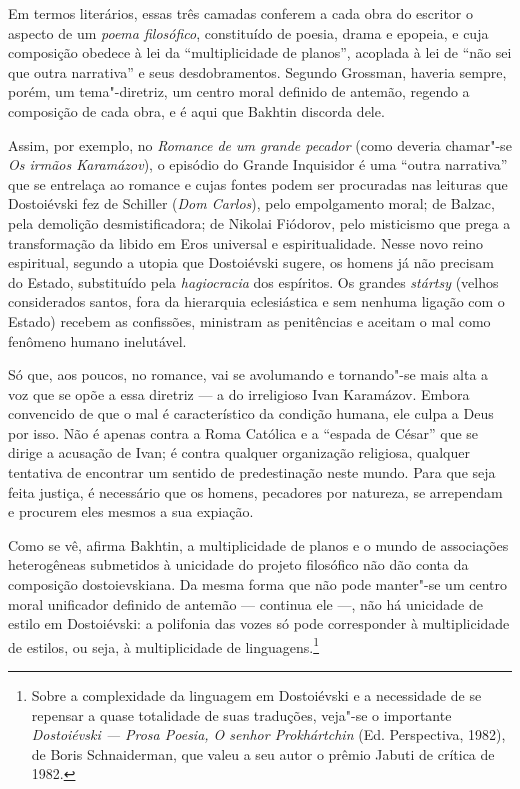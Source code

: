 {{Em termos literários, essas três camadas confe­rem a cada obra do
escritor o aspecto de um \emph{poema filosófico}, constituído de poesia,
drama e epopeia, e cuja composição obedece à lei da ``multiplicidade de
planos'', acoplada à lei de ``não sei que outra narrativa'' e seus
desdobramentos. Segundo Grossman, haveria sempre, porém, um
tema"-diretriz, um centro moral definido de antemão, regendo a composição
de cada obra, e é aqui que Bakhtin discorda dele.

Assim, por exemplo, no \emph{Romance de um grande pecador} (como deveria
chamar"-se \emph{Os irmãos Karamázov}), o episódio do Grande
Inquisidor é uma ``outra narrativa'' que se entrelaça ao romance e cujas
fontes podem ser procuradas nas leituras que Dostoiévski fez de Schiller
(\emph{Dom Carlos}), pelo empolgamento moral; de Balzac, pela
demolição desmistificadora; de Nikolai Fiódorov, pelo misticismo que
prega a transformação da libido em Eros universal e espiritualidade.
Nesse novo reino espiritual, segundo a utopia que Dostoiévski sugere, os
homens já não precisam do Estado, substituído pela \emph{hagiocracia}
dos espíritos. Os grandes \emph{stártsy} (velhos considerados santos,
fora da hierarquia eclesiástica e sem nenhuma ligação com o Estado)
recebem as confissões, ministram as penitências e aceitam o mal como
fenômeno humano inelutável.

Só que, aos poucos, no romance, vai se avolu­mando e tornando"-se mais
alta a voz que se opõe a essa diretriz --- a do irreligioso Ivan
Karamázov. Embora convencido de que o mal é característico da condição
humana, ele culpa a Deus por isso. Não é apenas contra a Roma Católica e
a ``espada de César'' que se dirige a acusação de Ivan; é contra
qualquer organização religiosa, qualquer tentativa de encontrar um
sentido de predestinação neste mundo. Para que seja feita justiça, é
necessário que os homens, pecadores por natureza, se arrependam e
procu­rem eles mesmos a sua expiação.

Como se vê, afirma Bakhtin, a multiplicidade de planos e o mundo de
associações heterogêneas submetidos à unicidade do projeto filosófico
não dão conta da composição dostoievskiana. Da mesma forma que não pode
manter"-se um centro moral unificador definido de antemão --- continua ele
---, não há unicidade de estilo em Dostoiévski: a polifonia das vozes só
pode corresponder à multiplicidade de estilos, ou seja, à multiplicidade
de linguagens.\footnote{Sobre a complexidade da linguagem em Dostoiévski
  e a necessidade de se repensar a quase totalidade de suas traduções,
  veja"-se o importante \emph{Dostoiévski --- Prosa Poesia, O senhor
  Prokhártchin} (Ed. Perspectiva, 1982), de Boris Schnaiderman, que
  valeu a seu autor o prêmio Jabuti de crítica de 1982.}

}}
